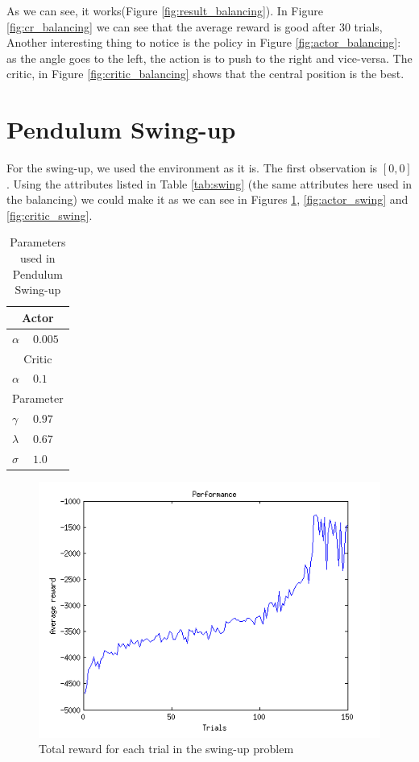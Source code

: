 \documentclass{article}
\begin{document}
As we can see, it works(Figure \ref{fig:result_balancing}). In Figure \ref{fig:cr_balancing} we can see that the average reward is good after 30 trials, Another interesting thing to notice is the policy in Figure \ref{fig:actor_balancing}: as the angle goes to the left, the action is to push to the right and vice-versa. The critic, in Figure \ref{fig:critic_balancing} shows that the central position is the best.


\section{Pendulum Swing-up}
For the swing-up, we used the environment as it is. The first observation is $[0,0]$.
Using the attributes listed in Table \ref{tab:swing} (the same attributes here used in the balancing) we could make it as we can see in Figures \ref{fig:cr_swing}, \ref{fig:actor_swing} and \ref{fig:critic_swing}.

\begin{table}
    \centering
    \begin{tabular}{ll}
    \multicolumn{2}{c}{Actor}   \\ \hline
    $\alpha$       & $0.005$    \\
    \multicolumn{2}{c}{Critic}   \\ \hline
    $\alpha$       & $0.1$      \\
    \multicolumn{2}{c}{Parameter}   \\ \hline
    $\gamma$       & $0.97$     \\
    $\lambda$      & $0.67$     \\
    $\sigma$       & $1.0$      \\
    \end{tabular}
    \caption{Parameters used in Pendulum Swing-up}
    \label{tab:balancing}
\end{table}

\begin{figure}[h!]
    \centering
    \includegraphics[width=.7\textwidth]{cr_swing.png}
    \caption{Total reward for each trial in the swing-up problem}
    \label{fig:cr_swing}
\end{figure}
\end{document}
